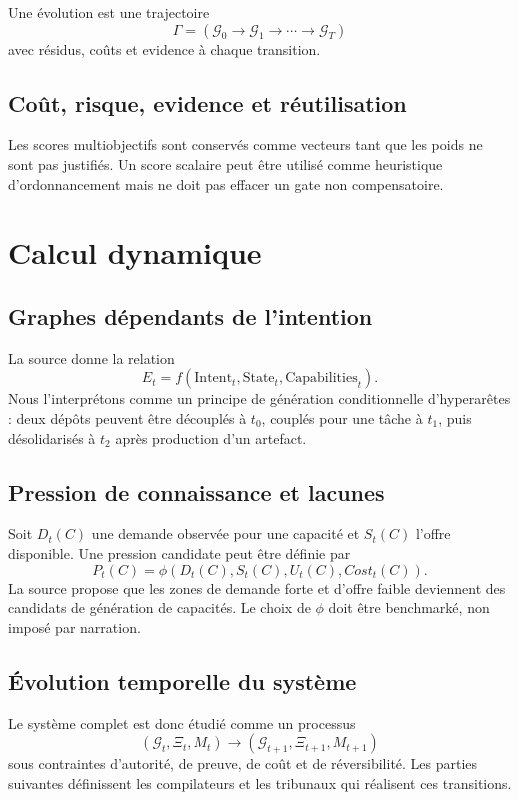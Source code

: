 Une évolution est une trajectoire
\[
\Gamma=(\mathcal G_0\to\mathcal G_1\to\cdots\to\mathcal G_T)
\]
avec résidus, coûts et evidence à chaque transition.

\section{Coût, risque, evidence et réutilisation}

Les scores multiobjectifs sont conservés comme vecteurs tant que les poids ne sont pas justifiés. Un score scalaire peut être utilisé comme heuristique d'ordonnancement mais ne doit pas effacer un gate non compensatoire.

\chapter{Calcul dynamique}

\section{Graphes dépendants de l'intention}

La source donne la relation
\[
E_t=f(\mathrm{Intent}_t,\mathrm{State}_t,\mathrm{Capabilities}_t).
\]
Nous l'interprétons comme un principe de génération conditionnelle d'hyperarêtes : deux dépôts peuvent être découplés à $t_0$, couplés pour une tâche à $t_1$, puis désolidarisés à $t_2$ après production d'un artefact.

\section{Pression de connaissance et lacunes}

Soit $D_t(C)$ une demande observée pour une capacité et $S_t(C)$ l'offre disponible. Une pression candidate peut être définie par
\[
P_t(C)=\phi(D_t(C),S_t(C),U_t(C),Cost_t(C)).
\]
La source propose que les zones de demande forte et d'offre faible deviennent des candidats de génération de capacités. Le choix de $\phi$ doit être benchmarké, non imposé par narration.

\section{Évolution temporelle du système}

Le système complet est donc étudié comme un processus
\[
(\mathcal G_t,\Xi_t,M_t)\longrightarrow(\mathcal G_{t+1},\Xi_{t+1},M_{t+1})
\]
sous contraintes d'autorité, de preuve, de coût et de réversibilité. Les parties suivantes définissent les compilateurs et les tribunaux qui réalisent ces transitions.
